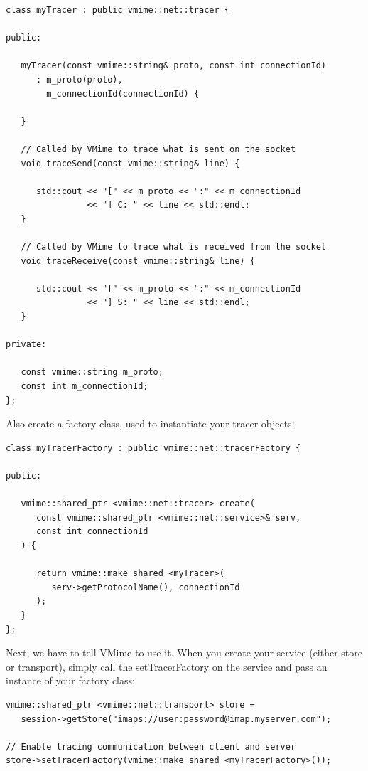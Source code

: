 \begin{lstlisting}[caption={A simple tracer}]
class myTracer : public vmime::net::tracer {

public:

   myTracer(const vmime::string& proto, const int connectionId)
      : m_proto(proto),
        m_connectionId(connectionId) {

   }

   // Called by VMime to trace what is sent on the socket
   void traceSend(const vmime::string& line) {

      std::cout << "[" << m_proto << ":" << m_connectionId
                << "] C: " << line << std::endl;
   }

   // Called by VMime to trace what is received from the socket
   void traceReceive(const vmime::string& line) {

      std::cout << "[" << m_proto << ":" << m_connectionId
                << "] S: " << line << std::endl;
   }

private:

   const vmime::string m_proto;
   const int m_connectionId;
};
\end{lstlisting}

Also create a factory class, used to instantiate your tracer objects:

\begin{lstlisting}
class myTracerFactory : public vmime::net::tracerFactory {

public:

   vmime::shared_ptr <vmime::net::tracer> create(
      const vmime::shared_ptr <vmime::net::service>& serv,
      const int connectionId
   ) {

      return vmime::make_shared <myTracer>(
         serv->getProtocolName(), connectionId
      );
   }
};
\end{lstlisting}

Next, we have to tell VMime to use it. When you create your service
(either store or transport), simply call the {\vcode setTracerFactory}
on the service and pass an instance of your factory class:

\begin{lstlisting}[caption={Enabling tracer on a connection}]
vmime::shared_ptr <vmime::net::transport> store =
   session->getStore("imaps://user:password@imap.myserver.com");

// Enable tracing communication between client and server
store->setTracerFactory(vmime::make_shared <myTracerFactory>());
\end{lstlisting}

